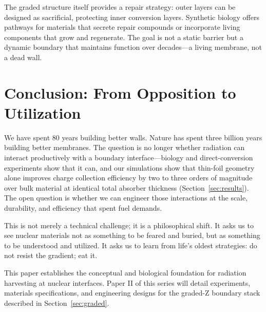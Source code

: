 \documentclass[12pt]{article}
\begin{document}
The graded structure itself provides a repair strategy: outer layers can be designed as
sacrificial, protecting inner conversion layers. Synthetic biology offers pathways for
materials that secrete repair compounds or incorporate living components that grow and
regenerate. The goal is not a static barrier but a dynamic boundary that maintains
function over decades---a living membrane, not a dead wall.

\section{Conclusion: From Opposition to Utilization}

We have spent 80 years building better walls. Nature has spent three billion years
building better membranes. The question is no longer whether radiation can interact
productively with a boundary interface---biology and direct-conversion experiments show
that it can, and our simulations show that thin-foil geometry alone improves charge
collection efficiency by two to three orders of magnitude over bulk material at identical
total absorber thickness (Section~\ref{sec:results}). The open
question is whether we can engineer those interactions at the scale, durability, and
efficiency that spent fuel demands.

This is not merely a technical challenge; it is a philosophical shift. It asks us to see
nuclear materials not as something to be feared and buried, but as something to be
understood and utilized. It asks us to learn from life's oldest strategies: do not resist
the gradient; eat it.

This paper establishes the conceptual and biological foundation for radiation harvesting
at nuclear interfaces. Paper II of this series will detail experiments, materials
specifications, and engineering designs for the graded-Z boundary stack described in
Section~\ref{sec:graded}.



\end{document}
